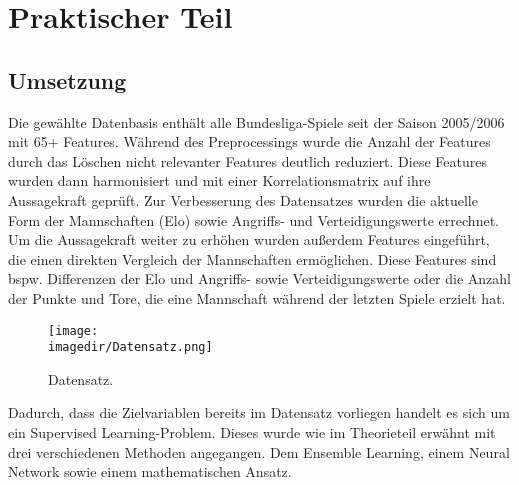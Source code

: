 \chapter{Praktischer Teil}

\section{Umsetzung}
Die gewählte Datenbasis enthält alle Bundesliga-Spiele seit der Saison 2005/2006 mit
65+ Features. Während des Preprocessings wurde die Anzahl der Features durch
das Löschen nicht relevanter Features deutlich reduziert. Diese Features wurden dann
harmonisiert und mit einer Korrelationsmatrix auf ihre Aussagekraft geprüft.
Zur Verbesserung des Datensatzes wurden die aktuelle Form der Mannschaften (Elo) sowie Angriffs- und Verteidigungswerte errechnet. Um die Aussagekraft weiter zu erhöhen wurden außerdem Features eingeführt, die einen direkten Vergleich der Mannschaften ermöglichen.
Diese Features sind bspw. Differenzen der Elo und Angriffs- sowie Verteidigungswerte
oder die Anzahl der Punkte und Tore, die eine Mannschaft während der letzten Spiele erzielt hat.

\begin{figure}[H]
	
	\centering
	\texttt{[image: \\imagedir/Datensatz.png]}
	\captionsetup{format=hang}
	\caption[Datensatz]{\label{fig:test}Datensatz.}
	
\end{figure}

Dadurch, dass die Zielvariablen bereits im Datensatz  vorliegen
handelt es sich um ein Supervised Learning-Problem. Dieses wurde
wie im Theorieteil erwähnt mit drei verschiedenen Methoden angegangen.
Dem Ensemble Learning, einem Neural Network sowie einem mathematischen Ansatz.

